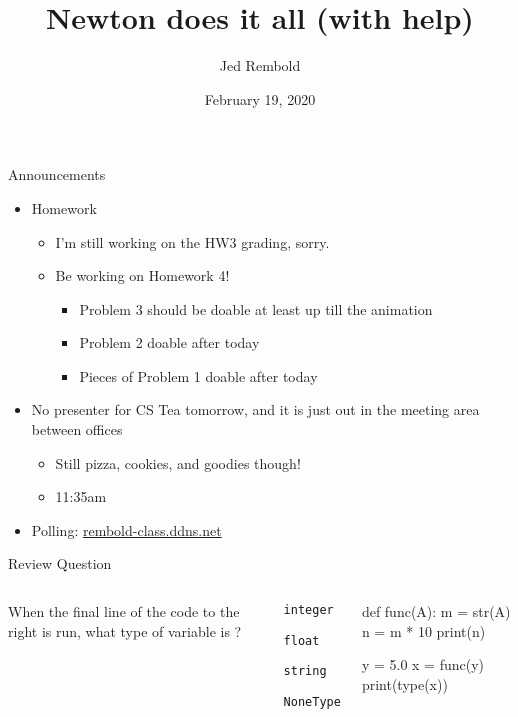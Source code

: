 \documentclass[pdf, aspectratio=169, 12pt]{beamer}
\title{Newton does it all (with help)}
\author{Jed Rembold}
\date{February 19, 2020}
\begin{document}
\begin{frame}{Announcements}
	\begin{itemize}
		\item Homework
			\begin{itemize}
				\item I'm still working on the HW3 grading, sorry. 
				\item Be working on Homework 4!
					\begin{itemize}
						\item Problem 3 should be doable at least up till the animation
						\item Problem 2 doable after today
						\item Pieces of Problem 1 doable after today
					\end{itemize}
			\end{itemize}
		\item No presenter for CS Tea tomorrow, and it is just out in the meeting area between offices
			\begin{itemize}
				\item Still pizza, cookies, and goodies though!
				\item 11:35am
			\end{itemize}
		\item Polling: \url{rembold-class.ddns.net}
	\end{itemize}
\end{frame}

\begin{frame}[fragile]{Review Question}
	\begin{columns}
		When the final line of the code to the right is run, what type of variable is ?
		\begin{poll}
			\item \texttt{integer}
			\item \texttt{float}
			\item \texttt{string}
			\item \texttt{NoneType}
		\end{poll}
		
		\begin{pythoncode}
			def func(A):
				m = str(A)
				n = m * 10
				print(n)

			y = 5.0
			x = func(y)
			print(type(x))
		\end{pythoncode}
	\end{columns}
	
\end{frame}
\end{document}
